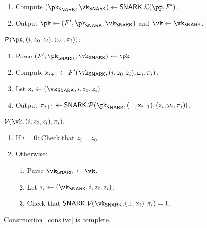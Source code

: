 \begin{construction}
\begin{mdframed}[nobreak=true]
\begin{enumerate}
       \item Compute 
       $(\pk_\snark, \vk_\snark) \gets \snark.\En(\pp, \FP)$.
       \item Output $\pk \gets (\FP, \pk_\snark, \vk_\snark)$ and $\vk \gets \vk_\snark$.
     \end{enumerate}
   \end{mdframed}
   \begin{mdframed}[nobreak=true]
     \underline{$\Po(\pk, (i, z_0, z_i), (\omega_i, \pi_i))$}:
     \begin{enumerate} 
       \item Parse $(\FP, \pk_\snark, \vk_\snark) \gets \pk$.
       \item Compute
       $\io_{i + 1} \gets \FP(\vk_{\snark},
       (i, z_0, z_i), \omega_i, \pi_i)$.
       \item Let $\io_i \gets (\vk_{\snark}, i, z_0, z_i)$
       \label{ivc:prover:io}
       \item Output
       $
       \pi_{i + 1} \gets \snark.\Po(\pk_\snark, (\bot, \io_{i + 1}), (\io_i
       , \omega_i, \pi_i))
       $.
       \label{ivc:prover:proof}
     \end{enumerate} 
   \end{mdframed}
   \begin{mdframed}[nobreak=true]
     \underline{$\V(\vk, (i, z_0, z_i), \pi_i)$}:
     \begin{enumerate}
       \item If $i = 0$: Check that $z_i = z_0$.
       \label{ivc:verifier:base}
       \item Otherwise:
       \begin{enumerate}
         \item Parse $\vk_{\snark} \gets \vk$.
         \item Let $\io_i \gets (\vk_\snark, i, z_0, z_i)$.
         \label{ivc:v:check:first}
         \item Check that
         $\snark.\V(\vk_\snark, (\bot, \io_i), \pi_i) = 1$.
         \label{ivc:v:check:second}
       \end{enumerate}
       
     \end{enumerate}
   \end{mdframed}
 \end{construction}

\begin{lemma}[Completeness]
 Construction~\ref{cons:ivc}
 is complete.
\end{lemma}
\newcommand{\proof}{\noindent{\bf Proof. }} %

